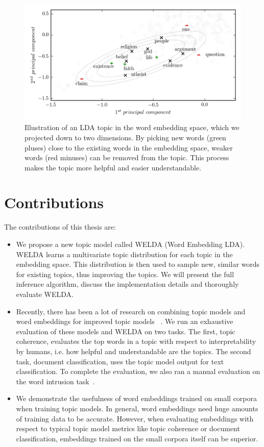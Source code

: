 \documentclass[
        a4paper,
        titlepage,
        twoside,
        parskip,
        numbers=noenddot
        ]{scrbook}
\theoremstyle{break}
\begin{document}
\begin{figure}
       \centering
       \includegraphics[width=\textwidth]{figures/figure1.png}
       \caption{Illustration of an LDA topic in the word embedding space, which we projected down to two dimensions.
       By picking new words (green pluses) close to the existing words in the embedding space, weaker words (red minuses) can be removed from the topic. This process makes the topic more helpful and easier understandable.}
       \label{fig:figure1}
\end{figure}

\section{Contributions}
The contributions of this thesis are:
\begin{itemize}
  \item
    We propose a new topic model called WELDA (Word Embedding LDA).
    WELDA learns a multivariate topic distribution for each topic in the embedding space.
    This distribution is then used to sample new, similar words for existing topics, thus improving the topics.
    We will present the full inference algorithm, discuss the implementation details and thoroughly evaluate WELDA.
  \item
    Recently, there has been a lot of research on combining topic models and word embeddings for improved topic models~\cite{Batmanghelich2016,Das2015,Li2016,Nguyen2015} .
    We run an exhaustive evaluation of these models and WELDA on two tasks.
    The first, topic coherence, evaluates the top words in a topic with respect to interpretability by humans, i.e. how helpful and understandable are the topics.
    The second task, document classification, uses the topic model output for text classification.
    To complete the evaluation, we also ran a manual evaluation on the word intrusion task~\cite{Chang2009}.
  \item
    We demonstrate the usefulness of word embeddings trained on small corpora when training topic models.
    In general, word embeddings need huge amounts of training data to be accurate.
    However, when evaluating embeddings with respect to typical topic model metrics like topic coherence or document classification, embeddings trained on the small corpora itself can be superior.
\end{itemize}
\end{document}

